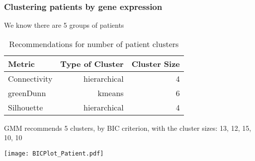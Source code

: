 \documentclass[10pt,dvipsnames,table]{beamer}
\DeclarePairedDelimiter\ceil{\lceil}{\rceil}
\begin{document}
\begin{frame}
\frametitle{Clustering patients by gene expression}
{\footnotesize
We know there are 5 groups of patients
\begin{table}[H]
\centering
\begin{tabular}{l|r|r}
\hline
Metric & Type of Cluster & Cluster Size \\ 
\hline
Connectivity & hierarchical & 4 \\
greenDunn & kmeans & 6 \\
Silhouette & hierarchical & 4 \\
\hline
\end{tabular}
\caption{Recommendations for number of patient clusters}
\end{table}
\pause 
GMM recommends 5 clusters, by BIC criterion, with the cluster sizes: 13, 12, 15, 10, 10
}
\begin{center}
\texttt{[image: BICPlot\_Patient.pdf]} \\
\end{center}
\end{frame}

\end{document}
